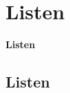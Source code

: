 \section{Listen}
\begin{frame}[c]
	\begin{center}
		\LARGE \textbf{Listen}
	\end{center}
\end{frame}
\subsection*{Listen}
